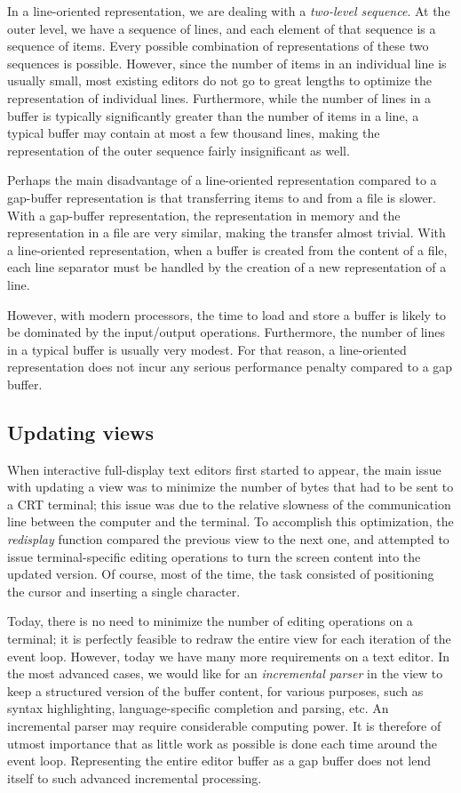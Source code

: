 In a line-oriented representation, we are dealing with a
\emph{two-level sequence}.  At the outer level, we have a sequence of
lines, and each element of that sequence is a sequence of items.
Every possible combination of representations of these two sequences
is possible.  However, since the number of items in an individual line
is usually small, most existing editors do not go to great lengths to
optimize the representation of individual lines.  Furthermore, while
the number of lines in a buffer is typically significantly greater
than the number of items in a line, a typical buffer may contain at
most a few thousand lines, making the representation of the outer
sequence fairly insignificant as well.

Perhaps the main disadvantage of a line-oriented representation
compared to a gap-buffer representation is that transferring items to
and from a file is slower.  With a gap-buffer representation, the
representation in memory and the representation in a file are very
similar, making the transfer almost trivial.  With a line-oriented
representation, when a buffer is created from the content of a file,
each line separator must be handled by the creation of a new
representation of a line.

However, with modern processors, the time to load and store a buffer
is likely to be dominated by the input/output operations.
Furthermore, the number of lines in a typical buffer is usually very
modest.  For that reason, a line-oriented representation does not
incur any serious performance penalty compared to a gap buffer.

\subsection{Updating views}

When interactive full-display text editors first started to appear,
the main issue with updating a view was to minimize the number of
bytes that had to be sent to a CRT terminal; this issue was due to the
relative slowness of the communication line between the computer and
the terminal.  To accomplish this optimization, the \emph{redisplay}
function compared the previous view to the next one, and attempted to
issue terminal-specific editing operations to turn the screen content
into the updated version.  Of course, most of the time, the task
consisted of positioning the cursor and inserting a single character.

Today, there is no need to minimize the number of editing operations
on a terminal; it is perfectly feasible to redraw the entire view for
each iteration of the event loop.  However, today we have many more
requirements on a text editor.  In the most advanced cases, we would
like for an \emph{incremental parser} in the view to keep a structured
version of the buffer content, for various purposes, such as syntax
highlighting, language-specific completion and parsing, etc.  An
incremental parser may require considerable computing power.  It is
therefore of utmost importance that as little work as possible is done
each time around the event loop.  Representing the entire editor
buffer as a gap buffer does not lend itself to such advanced
incremental processing.

